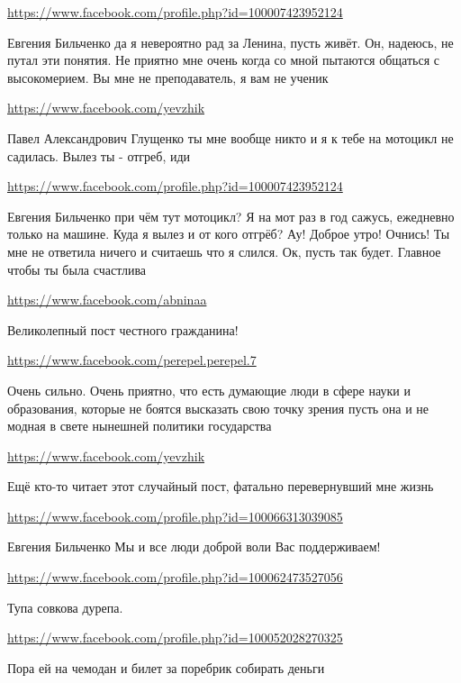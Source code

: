 \documentclass[a4paper,11pt]{extreport}
\begin{document}
\begin{itemize}
\begin{itemize}
\url{https://www.facebook.com/profile.php?id=100007423952124}

Евгения Бильченко да я невероятно рад за Ленина, пусть живёт. Он, надеюсь, не путал эти понятия. Не приятно мне очень когда со мной пытаются общаться с высокомерием. Вы мне не преподаватель, я вам не ученик

\url{https://www.facebook.com/yevzhik}

Павел Александрович Глущенко ты мне вообще никто и я к тебе на мотоцикл не садилась. Вылез ты - отгреб, иди

\url{https://www.facebook.com/profile.php?id=100007423952124}

Евгения Бильченко при чём тут мотоцикл? Я на мот раз в год сажусь, ежедневно только на машине. Куда я вылез и от кого отгрёб? Ау! Доброе утро! Очнись! Ты мне не ответила ничего и считаешь что я слился. Ок, пусть так будет. Главное чтобы ты была счастлива

\end{itemize}
\url{https://www.facebook.com/abninaa}

Великолепный пост честного гражданина!

\url{https://www.facebook.com/perepel.perepel.7}

Очень сильно. Очень приятно, что есть думающие люди в сфере науки и образования, которые не боятся высказать свою точку зрения пусть она и не модная в свете нынешней политики государства

\url{https://www.facebook.com/yevzhik}

Ещё кто-то читает этот случайный пост, фатально перевернувший мне жизнь

\begin{itemize}
\url{https://www.facebook.com/profile.php?id=100066313039085}

Евгения Бильченко Мы и все люди доброй воли Вас поддерживаем!

\end{itemize}
\url{https://www.facebook.com/profile.php?id=100062473527056}

Тупа совкова дурепа.

\url{https://www.facebook.com/profile.php?id=100052028270325}

Пора ей на чемодан и билет за поребрик собирать деньги

\end{itemize}
\end{document}
